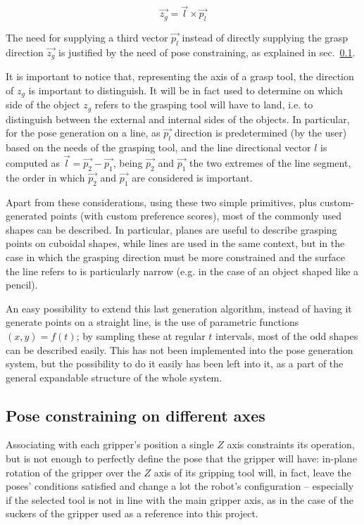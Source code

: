 \begin{equation}
  \vec{z_{g}}=\vec{l} \times \vec{p_l}
\end{equation}

The need for supplying a third vector $\vec{p_l}$ instead of directly
supplying the grasp direction $\vec{z_g}$ is justified by the need of
pose constraining, as explained in sec.~\ref{sec:pose-constraining}.


It is important to notice that, representing the axis of a grasp tool,
the direction of $z_g$ is important to distinguish. It will be in fact
used to determine on which side of the object $z_g$ refers to the
grasping tool will have to land, i.e. to distinguish between the
external and internal sides of the objects. In particular, for the
pose generation on a line, as $\vec{p_l}$ direction is predetermined
(by the user) based on the needs of the grasping tool, and the line
directional vector $l$ is computed as $\vec{l}=\vec{p_2}-\vec{p_1}$,
being $\vec{p_2}$ and $\vec{p_1}$ the two extremes of the line
segment, the order in which $\vec{p_2}$ and $\vec{p_1}$ are considered
is important.

Apart from these considerations, using these two simple primitives,
plus custom-generated points (with custom preference scores), most of
the commonly used shapes can be described. In particular, planes are
useful to describe grasping points on cuboidal shapes, while lines are
used in the same context, but in the case in which the grasping
direction must be more constrained and the surface the line refers to
is particularly narrow (e.g. in the case of an object shaped like a pencil).

An easy possibility to extend this last generation algorithm, instead
of having it generate points on a straight line, is the use of
parametric functions $(x,y)=f(t)$; by sampling these at regular $t$
intervals, most of the odd shapes can be described easily. This has
not been implemented into the pose generation system, but the
possibility to do it easily has been left into it, as a part of the
general expandable structure of the whole system.

\subsection{Pose constraining on different axes} \label{sec:pose-constraining}
Associating with each gripper's position a single $Z$ axis constraints
its operation, but is not enough to perfectly define the pose that the
gripper will have: in-plane rotation of the gripper over the $Z$ axis
of its gripping tool will, in fact, leave the poses' conditions
satisfied and change a lot the robot's configuration -- especially if
the selected tool is not in line with the main gripper axis, as in the
case of the suckers of the gripper used as a reference into this
project.

